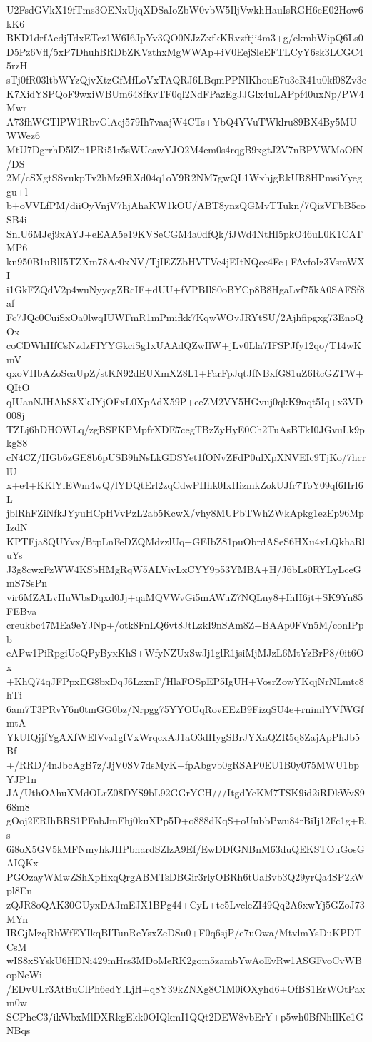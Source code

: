 U2FsdGVkX19fTms3OENxUjqXDSaIoZbW0vbW5IljVwkhHauIsRGH6eE02How6kK6
BKD1drfAedjTdxETcz1W6I6JpYv3QO0NJzZxfkKRvzftji4m3+g/ekmbWipQ6Ls0
D5Pz6Vfl/5xP7DhuhBRDbZKVzthxMgWWAp+iV0EejSleEFTLCyY6sk3LCGC45rzH
sTj0fR03ltbWYzQjvXtzGfMfLoVxTAQRJ6LBqmPPNlKhouE7u3eR41u0kf08Zv3e
K7XidYSPQoF9wxiWBUm648fKvTF0ql2NdFPazEgJJGlx4uLAPpf40uxNp/PW4Mwr
A73fhWGTlPW1RbvGlAcj579Ih7vaajW4CTs+YbQ4YVuTWklru89BX4By5MUWWez6
MtU7DgrrhD5lZn1PRi51r5sWUcawYJO2M4em0s4rqgB9xgtJ2V7nBPVWMoOfN/DS
2M/cSXgtSSvukpTv2hMz9RXd04q1oY9R2NM7gwQL1WxhjgRkUR8HPmsiYyeggu+l
b+oVVLfPM/diiOyVnjV7hjAhaKW1kOU/ABT8ynzQGMvTTukn/7QizVFbB5coSB4i
SnlU6MJej9xAYJ+eEAA5e19KVSeCGM4a0dfQk/iJWd4NtHl5pkO46uL0K1CATMP6
kn950B1uBlI5TZXm78Ac0xNV/TjIEZZbHVTVc4jEItNQcc4Fc+FAvfoIz3VsmWXI
i1GkFZQdV2p4wuNyycgZRcIF+dUU+fVPBIlS0oBYCp8B8HgaLvf75kA0SAFSf8af
Fc7JQc0CuiSxOa0lwqIUWFmR1mPmifkk7KqwWOvJRYtSU/2Ajhfipgxg73EnoQOx
coCDWhHfCsNzdzFIYYGkciSg1xUAAdQZwIlW+jLv0Lla7IFSPJfy12qo/T14wKmV
qxoVHbAZoScaUpZ/stKN92dEUXmXZ8L1+FarFpJqtJfNBxfG81uZ6RcGZTW+QItO
qIUanNJHAhS8XkJYjOFxL0XpAdX59P+eeZM2VY5HGvuj0qkK9nqt5Iq+x3VD008j
TZLj6hDHOWLq/zgBSFKPMpfrXDE7cegTBzZyHyE0Ch2TuAsBTkI0JGvuLk9pkgS8
cN4CZ/HGb6zGE8b6pUSB9hNsLkGDSYet1fONvZFdP0ulXpXNVEIc9TjKo/7hcrlU
x+e4+KKlYlEWm4wQ/lYDQtErl2zqCdwPHhk0IxHizmkZokUJfr7ToY09qf6HrI6L
jblRhFZiNfkJYyuHCpHVvPzL2ab5KcwX/vhy8MUPbTWhZWkApkg1ezEp96MpIzdN
KPTFja8QUYvx/BtpLnFeDZQMdzzlUq+GEIbZ81puObrdASeS6HXu4xLQkhaRluYs
J3g8cwxFzWW4KSbHMgRqW5ALVivLxCYY9p53YMBA+H/J6bLs0RYLyLceGmS7SsPn
vir6MZALvHuWbsDqxd0Jj+qaMQVWvGi5mAWuZ7NQLny8+IhH6jt+SK9Yn85FEBva
creukbc47MEa9eYJNp+/otk8FnLQ6vt8JtLzkI9nSAm8Z+BAAp0FVn5M/conIPpb
eAPw1PiRpgiUoQPyByxKhS+WfyNZUxSwJj1glR1jsiMjMJzL6MtYzBrP8/0it6Ox
+KhQ74qJFPpxEG8bxDqJ6LzxnF/HlaFOSpEP5IgUH+VosrZowYKqjNrNLmtc8hTi
6am7T3PRvY6n0tmGG0bz/Nrpgg75YYOUqRovEEzB9FizqSU4e+rnimlYVfWGfmtA
YkUIQjjfYgAXfWElVva1gfVxWrqcxAJ1aO3dHygSBrJYXaQZR5q8ZajApPhJb5Bf
+/RRD/4nJbcAgB7z/JjV0SV7dsMyK+fpAbgvb0gRSAP0EU1B0y075MWU1bpYJP1n
JA/UthOAhuXMdOLrZ08DYS9bL92GGrYCH///ItgdYeKM7TSK9id2iRDkWvS968m8
gOoj2ERIhBRS1PFnbJmFhj0kuXPp5D+o888dKqS+oUubbPwu84rBiIj12Fc1g+Rs
6i8oX5GV5kMFNmyhkJHPbnardSZlzA9Ef/EwDDfGNBnM63duQEKSTOuGosGAIQKx
PGOzayWMwZShXpHxqQrgABMTsDBGir3rlyOBRh6tUaBvb3Q29yrQa4SP2kWpl8En
zQJR8oQAK30GUyxDAJmEJX1BPg44+CyL+tc5LvcleZI49Qq2A6xwYj5GZoJ73MYn
IRGjMzqRhWfEYIkqBITunReYsxZeDSu0+F0q6sjP/e7uOwa/MtvlmYsDuKPDTCsM
wIS8xSYskU6HDNi429mHrs3MDoMeRK2gom5zambYwAoEvRw1ASGFvoCvWBopNcWi
/EDvULr3AtBuClPh6edYlLjH+q8Y39kZNXg8C1M0iOXyhd6+OfBS1ErWOtPaxm0w
SCPheC3/ikWbxMlDXRkgEkk0OIQkmI1QQt2DEW8vbErY+p5wh0BfNhIlKe1GNBqs
